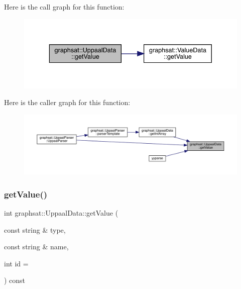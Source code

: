 Here is the call graph for this function\+:\nopagebreak
\begin{figure}[H]
\begin{center}
\leavevmode
\includegraphics[width=336pt]{classgraphsat_1_1_uppaal_data_a0990d1da543e593b05bba3791cd351d8_cgraph}
\end{center}
\end{figure}
Here is the caller graph for this function\+:\nopagebreak
\begin{figure}[H]
\begin{center}
\leavevmode
\includegraphics[width=350pt]{classgraphsat_1_1_uppaal_data_a0990d1da543e593b05bba3791cd351d8_icgraph}
\end{center}
\end{figure}
\mbox{\label{classgraphsat_1_1_uppaal_data_a888305aeaea6a3df4c01950155a14c24}} 
\subsubsection{\texorpdfstring{getValue()}{getValue()}\hspace{0.1cm}{\footnotesize\ttfamily [2/2]}}
{\footnotesize\ttfamily int graphsat\+::\+Uppaal\+Data\+::get\+Value (\begin{DoxyParamCaption}\item[{const string \&}]{type,  }\item[{const string \&}]{name,  }\item[{int}]{id = {} }\end{DoxyParamCaption}) const\hspace{0.3cm}{\ttfamily [inline]}}

